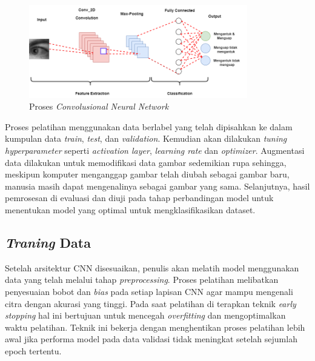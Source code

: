      \begin{figure}[H]
      \centering
      \includegraphics[width=0.85\textwidth]{figures/bab3/cnn_arsitektur.png}
      \caption{Proses \textit{Convolusional Neural Network}}
      \label{Proses Convolusional Neural Network}
    
      \medskip %
      \begin{minipage}{0.8\textwidth}
        \centering

      \end{minipage}
    \end{figure}

    Proses pelatihan menggunakan data berlabel yang telah dipisahkan ke dalam kumpulan data \textit{train}, \textit{test}, dan \textit{validation}. Kemudian akan dilakukan \textit{tuning hyperparameter} seperti \textit{activation layer}, \textit{learning rate} dan \textit{optimizer}. Augmentasi data dilakukan untuk memodifikasi data gambar sedemikian rupa sehingga, meskipun komputer menganggap gambar telah diubah sebagai gambar baru, manusia masih dapat mengenalinya sebagai gambar yang sama. Selanjutnya, hasil pemrosesan di evaluasi dan diuji pada tahap perbandingan model untuk menentukan model yang optimal untuk mengklasifikasikan dataset.

\subsection{\textit{Traning} Data}

    Setelah arsitektur CNN disesuaikan, penulis akan melatih model menggunakan data yang telah melalui tahap \textit{preprocessing}. Proses pelatihan melibatkan penyesuaian bobot dan \textit{bias} pada setiap lapisan CNN agar mampu mengenali citra dengan akurasi yang tinggi. Pada saat pelatihan di terapkan teknik \textit{early stopping} hal ini bertujuan untuk mencegah \textit{overfitting} dan mengoptimalkan waktu pelatihan. Teknik ini bekerja dengan menghentikan proses pelatihan lebih awal jika performa model pada data validasi tidak meningkat setelah sejumlah epoch tertentu.
    
